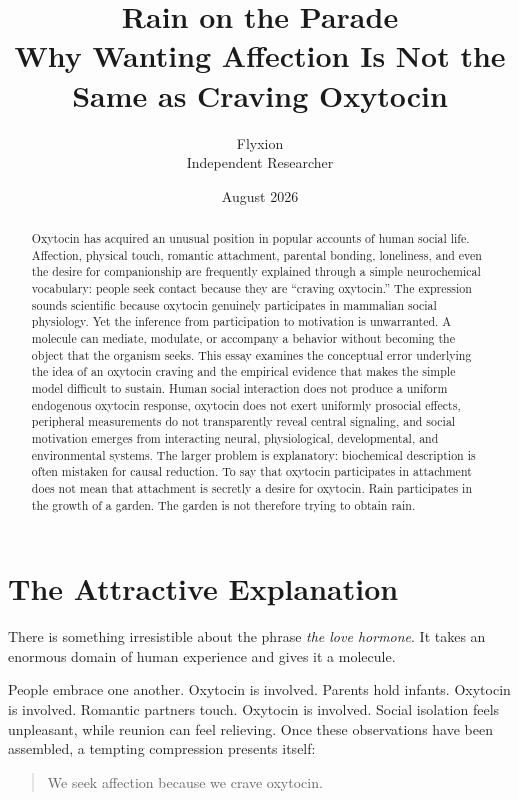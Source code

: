 \documentclass[12pt]{article}
\title{Rain on the Parade\\[0.3em]\large Why Wanting Affection Is Not the Same as Craving Oxytocin}
\author{Flyxion \\ \small Independent Researcher}
\date{August 2026}
\begin{document}
\maketitle

\begin{abstract}
Oxytocin has acquired an unusual position in popular accounts of human social life. Affection, physical touch, romantic attachment, parental bonding, loneliness, and even the desire for companionship are frequently explained through a simple neurochemical vocabulary: people seek contact because they are ``craving oxytocin.'' The expression sounds scientific because oxytocin genuinely participates in mammalian social physiology. Yet the inference from participation to motivation is unwarranted. A molecule can mediate, modulate, or accompany a behavior without becoming the object that the organism seeks. This essay examines the conceptual error underlying the idea of an oxytocin craving and the empirical evidence that makes the simple model difficult to sustain. Human social interaction does not produce a uniform endogenous oxytocin response, oxytocin does not exert uniformly prosocial effects, peripheral measurements do not transparently reveal central signaling, and social motivation emerges from interacting neural, physiological, developmental, and environmental systems. The larger problem is explanatory: biochemical description is often mistaken for causal reduction. To say that oxytocin participates in attachment does not mean that attachment is secretly a desire for oxytocin. Rain participates in the growth of a garden. The garden is not therefore trying to obtain rain.
\end{abstract}

\section{The Attractive Explanation}

There is something irresistible about the phrase \emph{the love hormone}. It takes an enormous domain of human experience and gives it a molecule.

People embrace one another. Oxytocin is involved. Parents hold infants. Oxytocin is involved. Romantic partners touch. Oxytocin is involved. Social isolation feels unpleasant, while reunion can feel relieving. Once these observations have been assembled, a tempting compression presents itself:

\begin{quote}
We seek affection because we crave oxytocin.
\end{quote}
\end{document}
